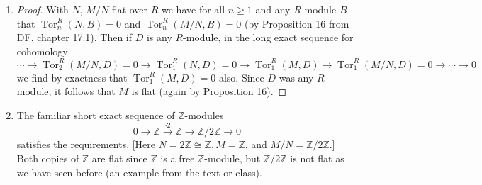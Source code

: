 \documentclass[11pt]{article}
\DeclareMathOperator{\Tor}{Tor}
\begin{document}
\begin{enumerate}[label=(\alph*)]
    Aside from this, it claims that the original short exact sequence \[0\to N\to M \to M/N\to 0\] splits anyways since $N$ is flat, which is a non sequitur since we already found a counterexample. For some reason ChatGPT does not stop here as this would have ``proved'' its claim: it attempts to produce yet again another section, and attempts to compose these two sections (which it cannot do since both sections have the same domain and codomain). Only after ``composing'' these two sections that it got from nowhere does it conclude the proof. This proof does not work, but it is impressive that it is written in the tone of a mathematical proof and uses mathematical language in a way that is ``right'' but not logically correct (e.g. it knows what it means for a short exact sequence to split but doesn't know that the above sequence splitting does not follow from either $N$ or $M/N$ being flat).
    \item \begin{proof}
        With $N$, $M/N$ flat over $R$ we have for all $n\geq 1$ and any $R$-module $B$ that $\Tor_n^R(N,B) = 0$ and $\Tor_n^R(M/N,B) = 0$ (by Proposition 16 from DF, chapter 17.1). Then if $D$ is any $R$-module, in the long exact sequence for cohomology  \[\cdots\to \Tor_2^R(M/N,D) =0\to \Tor_1^R(N,D) = 0\to \Tor_1^R(M,D)\to \Tor_1^R(M/N,D) = 0\to\cdots\to 0\] we find by exactness that $ \Tor_1^R(M,D) = 0$ also. Since $D$ was any $R$-module, it follows that $M$ is flat (again by Proposition 16).
    \end{proof}
    \item The familiar short exact sequence of $\mathbb{Z}$-modules \[0\to \mathbb{Z}\xrightarrow{\cdot 2}\mathbb{Z}\to \mathbb{Z}/2\mathbb{Z}\to 0\] satisfies the requirements. [Here $N = 2\mathbb{Z}\cong\mathbb{Z}, M = \mathbb{Z}$, and $M/N = \mathbb{Z}/2\mathbb{Z}$.] Both copies of $\mathbb{Z}$ are flat since $\mathbb{Z}$ is a free $\mathbb{Z}$-module, but $\mathbb{Z}/2\mathbb{Z}$ is not flat as we have seen before (an example from the text or class).
   \end{enumerate}
\end{document}
